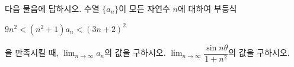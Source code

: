 다음 물음에 답하시오.
 수열 $\{a_n\}$이 모든 자연수 $n$에 대하여 부등식 \par\smallskip\centerline{$9n^2<(n^2+1)a_n<(3n+2)^2$}\par\smallskip\noindent 을 만족시킬 때, $\displaystyle\lim_{n\to\infty}a_n$의 값을 구하시오.
 $\displaystyle\lim_{n\to\infty}\dfrac{\sin n\theta}{1+n^2}$의 값을 구하시오. 
